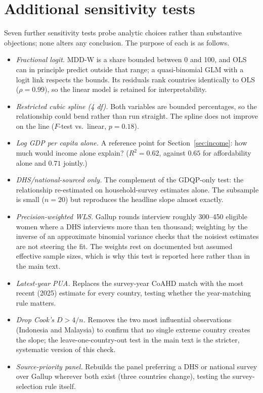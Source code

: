 \documentclass[11pt]{article}
\begin{document}
\section{Additional sensitivity tests}\label{app:sens}

Seven further sensitivity tests probe analytic choices rather than substantive objections; none alters any conclusion. The purpose of each is as follows.

\begin{itemize}
\item \emph{Fractional logit.} MDD-W is a share bounded between 0 and 100, and OLS can in principle predict outside that range; a quasi-binomial GLM with a logit link respects the bounds. Its residuals rank countries identically to OLS ($\rho=0.99$), so the linear model is retained for interpretability.
\item \emph{Restricted cubic spline (4 df).} Both variables are bounded percentages, so the relationship could bend rather than run straight. The spline does not improve on the line ($F$-test vs.\ linear, $p=0.18$).
\item \emph{Log GDP per capita alone.} A reference point for Section~\ref{sec:income}: how much would income alone explain? ($R^2=0.62$, against $0.65$ for affordability alone and $0.71$ jointly.)
\item \emph{DHS/national-sourced only.} The complement of the GDQP-only test: the relationship re-estimated on household-survey estimates alone. The subsample is small ($n=20$) but reproduces the headline slope almost exactly.
\item \emph{Precision-weighted WLS.} Gallup rounds interview roughly 300--450 eligible women where a DHS interviews more than ten thousand; weighting by the inverse of an approximate binomial variance checks that the noisiest estimates are not steering the fit. The weights rest on documented but assumed effective sample sizes, which is why this test is reported here rather than in the main text.
\item \emph{Latest-year PUA.} Replaces the survey-year CoAHD match with the most recent (2025) estimate for every country, testing whether the year-matching rule matters.
\item \emph{Drop Cook's $D>4/n$.} Removes the two most influential observations (Indonesia and Malaysia) to confirm that no single extreme country creates the slope; the leave-one-country-out test in the main text is the stricter, systematic version of this check.
\item \emph{Source-priority panel.} Rebuilds the panel preferring a DHS or national survey over Gallup wherever both exist (three countries change), testing the survey-selection rule itself.
\end{itemize}
\end{document}
